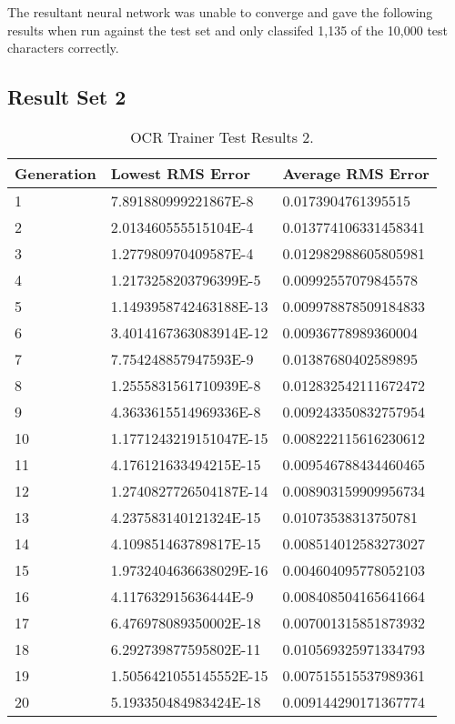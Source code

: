 The resultant neural network was unable to converge and gave the
following results when run against the test set and only classifed
1,135 of the 10,000 test characters correctly.

\newpage
\subsection{Result Set 2}

\begin{center}
    \begin{longtable}{ | l | l | l |}
      \caption{OCR Trainer Test Results 2.} \label{ocr2} \\
    \hline
  Generation & Lowest RMS Error & Average RMS Error \\ \hline
1 &	7.891880999221867E-8 &	0.0173904761395515 \\ \hline
2 &	2.013460555515104E-4 &	0.013774106331458341 \\ \hline
3 &	1.277980970409587E-4 &	0.012982988605805981 \\ \hline
4 &	1.2173258203796399E-5 &	0.00992557079845578 \\ \hline
5 &	1.1493958742463188E-13 &	0.009978878509184833 \\ \hline
6 &	3.4014167363083914E-12 &	0.00936778989360004 \\ \hline
7 &	7.754248857947593E-9 &	0.01387680402589895 \\ \hline
8 &	1.2555831561710939E-8 &	0.012832542111672472 \\ \hline
9 &	4.3633615514969336E-8 &	0.009243350832757954 \\ \hline
10 &	1.1771243219151047E-15 &	0.008222115616230612 \\ \hline
11 &	4.176121633494215E-15 &	0.009546788434460465 \\ \hline
12 &	1.2740827726504187E-14 &	0.008903159909956734 \\ \hline
13 &	4.237583140121324E-15 &	0.01073538313750781 \\ \hline
14 &	4.109851463789817E-15 &	0.008514012583273027 \\ \hline
15 &	1.9732404636638029E-16 &	0.004604095778052103 \\ \hline
16 &	4.117632915636444E-9 &	0.008408504165641664 \\ \hline
17 &	6.476978089350002E-18 &	0.007001315851873932 \\ \hline
18 &	6.292739877595802E-11 &	0.010569325971334793 \\ \hline
19 &	1.5056421055145552E-15 &	0.007515515537989361 \\ \hline
20 &	5.193350484983424E-18 &	0.009144290171367774 \\ \hline
\end{longtable}
\end{center}

